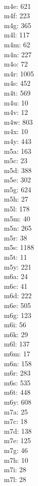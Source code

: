 \begin{multicols}{8}
  \\m4e: 621
  \\m4f: 223
  \\m4g: 365
  \\m4l: 117
  \\m4m: 62
  \\m4n: 227
  \\m4o: 72
  \\m4r: 1005
  \\m4s: 452
  \\m4t: 569
  \\m4u: 10
  \\m4v: 12
  \\m4w: 803
  \\m4x: 10
  \\m4y: 443
  \\m5a: 163
  \\m5c: 23
  \\m5d: 388
  \\m5e: 302
  \\m5g: 624
  \\m5h: 27
  \\m5l: 178
  \\m5m: 40
  \\m5n: 265
  \\m5r: 38
  \\m5s: 1188
  \\m5t: 11
  \\m5y: 221
  \\m6a: 24
  \\m6c: 41
  \\m6d: 222
  \\m6e: 505
  \\m6g: 123
  \\m6i: 56
  \\m6k: 29
  \\m6l: 137
  \\m6m: 17
  \\m6n: 158
  \\m6r: 283
  \\m6s: 535
  \\m6t: 448
  \\m6y: 608
  \\m7a: 25
  \\m7c: 18
  \\m7d: 138
  \\m7e: 125
  \\m7g: 46
  \\m7h: 10
  \\m7i: 28
  \\m7l: 28

\end{multicols}
